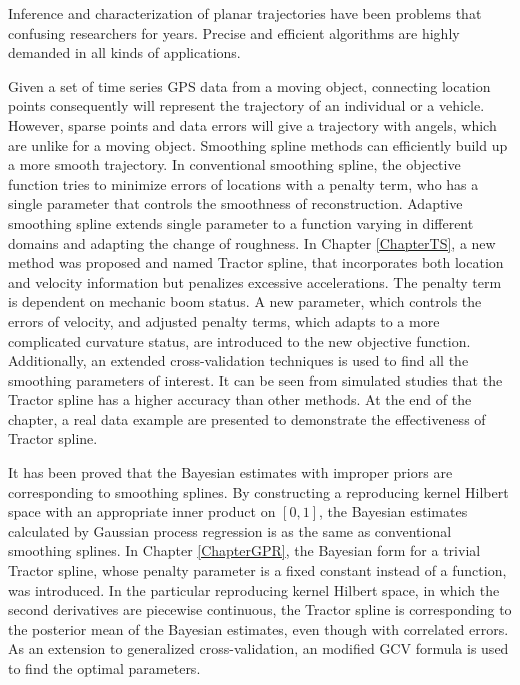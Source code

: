 
Inference and characterization of planar trajectories have been problems that confusing researchers for years. Precise and efficient algorithms are highly demanded in all kinds of applications. 

Given a set of time series GPS data from a moving object, connecting location points consequently will represent the trajectory of an individual or a vehicle. However, sparse points and data errors will give a trajectory with angels, which are unlike for a moving object. Smoothing spline methods can efficiently build up a more smooth trajectory. In conventional smoothing spline, the objective function tries to minimize errors of locations with a penalty term, who has a single parameter that controls the smoothness of reconstruction. Adaptive smoothing spline extends single parameter to a function varying in different domains and adapting the change of roughness. In Chapter \ref{ChapterTS}, a new method was proposed and named Tractor spline, that incorporates both location and velocity information but penalizes excessive accelerations. The penalty term is dependent on mechanic boom status. A new parameter, which controls the errors of velocity, and adjusted penalty terms, which adapts to a more complicated curvature status, are introduced to the new objective function. Additionally, an extended cross-validation techniques is used to find all the smoothing parameters of interest. It can be seen from simulated studies that the Tractor spline has a higher accuracy than other methods. At the end of the chapter, a real data example are presented to demonstrate the effectiveness of Tractor spline.


It has been proved that the Bayesian estimates with improper priors are corresponding to smoothing splines. By constructing a reproducing kernel Hilbert space with an appropriate inner product on $[0,1]$, the Bayesian estimates calculated by Gaussian process regression is as the same as conventional smoothing splines. In Chapter \ref{ChapterGPR}, the Bayesian form for a trivial Tractor spline, whose penalty parameter is a fixed constant instead of a function, was introduced. In the particular reproducing kernel Hilbert space, in which the second derivatives are piecewise continuous, the Tractor spline is corresponding to the posterior mean of the Bayesian estimates, even though with correlated errors. As an extension to generalized cross-validation, an modified GCV formula is used to find the optimal parameters. 


